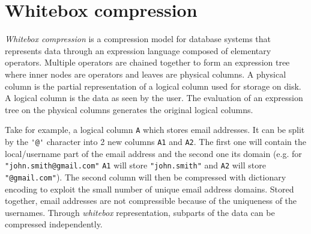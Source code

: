 


\section{Whitebox compression}

\textit{Whitebox compression} is a compression model for database systems that represents data through an expression language composed of elementary operators. Multiple operators are chained together to form an expression tree where inner nodes are operators and leaves are physical columns. A physical column is the partial representation of a logical column used for storage on disk. A logical column is the data as seen by the user. The evaluation of an expression tree on the physical columns generates the original logical columns. 

Take for example, a logical column \verb|A| which stores email addresses. It can be split by the \verb|'@'| character into 2 new columns \verb|A1| and \verb|A2|. The first one will contain the local/username part of the email address and the second one its domain (e.g. for \verb|"john.smith@gmail.com"| \verb|A1| will store \verb|"john.smith"| and \verb|A2| will store \verb|"@gmail.com"|). The second column will then be compressed with dictionary encoding to exploit the small number of unique email address domains. Stored together, email addresses are not compressible because of the uniqueness of the usernames. Through \textit{whitebox} representation, subparts of the data can be compressed independently.

